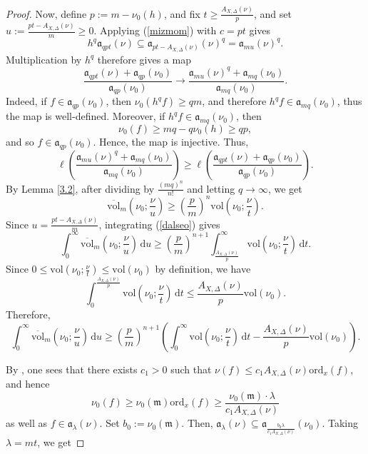 \documentclass[a4paper,12pt]{amsart}
\theoremstyle{definition} %
\theoremstyle{remark}
\numberwithin{equation}{section}
\begin{document}
\begin{proof}
Now, define $p:=m-\nu_0(h)$, and fix $t\ge \frac{A_{X,\Delta}(\nu)}{p}$, and set $u:=\frac{pt-A_{X,\Delta}(\nu)}{m}\ge 0$. Applying (\ref{mizmom}) with $c=pt$ gives
$$ h^q\mathfrak{a}_{qpt}(\nu)\subseteq \mathfrak{a}_{pt-A_{X,\Delta}(\nu)}(\nu)^q=\mathfrak{a}_{mu}(\nu)^q. $$
Multiplication by $h^q$ therefore gives a map
$$ \frac{\mathfrak{a}_{qpt}(\nu)+\mathfrak{a}_{qp}(\nu_0)}{\mathfrak{a}_{qp}(\nu_0)}\to \frac{\mathfrak{a}_{mu}(\nu)^q+\mathfrak{a}_{mq}(\nu_0)}{\mathfrak{a}_{mq}(\nu_0)}.$$
Indeed, if $f\in \mathfrak{a}_{qp}(\nu_0)$, then $\nu_0(h^qf)\ge qm$, and therefore $h^qf\in \mathfrak{a}_{mq}(\nu_0)$, thus the map is well-defined. Moreover, if $h^qf\in \mathfrak{a}_{mq}(\nu_0)$, then
$$ \nu_0(f)\ge mq-q\nu_0(h)\ge qp,$$
and so $f\in \mathfrak{a}_{qp}(\nu_0)$. Hence, the map is injective. Thus,
$$ \ell\left(\frac{\mathfrak{a}_{mu}(\nu)^q+\mathfrak{a}_{mq}(\nu_0)}{\mathfrak{a}_{mq}(\nu_0)}\right)\ge \ell\left(\frac{\mathfrak{a}_{qpt}(\nu)+\mathfrak{a}_{qp}(\nu_0)}{\mathfrak{a}_{qp}(\nu_0)}\right).$$
By Lemma \ref{3.2}, after dividing by $\frac{(mq)^n}{n!}$ and letting $q\to \infty$, we get
\begin{equation} \label{dalseo}
\overline{\mathrm{vol}}_m\left(\nu_0;\frac{\nu}{u}\right)\ge \left(\frac{p}{m}\right)^n\mathrm{vol}\left(\nu_0;\frac{\nu}{t}\right).
\end{equation}
Since $u=\frac{pt-A_{X,\Delta}(\nu)}{m}$, integrating (\ref{dalseo}) gives
$$ \int^{\infty}_0 \overline{\mathrm{vol}}_m\left(\nu_0;\frac{\nu}{u}\right)\,\mathrm{d}u\ge \left(\frac{p}{m}\right)^{n+1}\int^{\infty}_{\frac{A_{X,\Delta}(\nu)}{p}}\mathrm{vol}\left(\nu_0;\frac{\nu}{t}\right)\,\mathrm{d}t.$$
Since $0\le \mathrm{vol}\left(\nu_0;\frac{\nu}{t}\right)\le \mathrm{vol}(\nu_0)$ by definition, we have 
$$\int^{\frac{A_{X,\Delta}(\nu)}{p}}_0\mathrm{vol}\left(\nu_0;\frac{\nu}{t}\right)\,\mathrm{d} t\le \frac{A_{X,\Delta}(\nu)}{p}\mathrm{vol}(\nu_0).$$
Therefore,
\begin{equation} \label{park}
\int^{\infty}_0 \overline{\mathrm{vol}}_m\left(\nu_0;\frac{\nu}{u}\right)\,\mathrm{d}u\ge \left(\frac{p}{m}\right)^{n+1}\left(\int^{\infty}_0\mathrm{vol}\left(\nu_0;\frac{\nu}{t}\right)\,\mathrm{d}t-\frac{A_{X,\Delta}(\nu)}{p}\mathrm{vol}(\nu_0)\right).
\end{equation}

\smallskip

By \cite[Proposition 7.45]{Xu25}, one sees that there exists $c_1>0$ such that $\nu(f)\le c_1A_{X,\Delta}(\nu)\mathrm{ord}_x(f)$, and hence
$$ \nu_0(f)\ge \nu_0(\mathfrak{m})\mathrm{ord}_x(f)\ge \frac{\nu_0(\mathfrak{m})\cdot \lambda}{c_1A_{X,\Delta}(\nu)}$$
as well as $f\in \mathfrak{a}_{\lambda}(\nu)$. Set $b_0:=\nu_0(\mathfrak{m})$. Then, $\mathfrak{a}_{\lambda}(\nu)\subseteq \mathfrak{a}_{\frac{b_0 \lambda}{c_1A_{X,\Delta}(\nu)}}(\nu_0)$. Taking $\lambda=mt$, we get


\end{proof}
\end{document}
